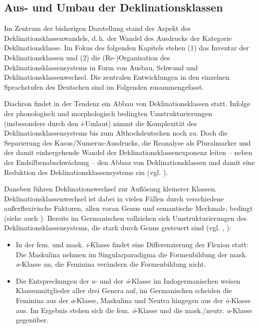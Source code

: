 \subsection{Aus- und Umbau der Deklinationsklassen}
\label{sec:3.1.2}
Im Zentrum der bisherigen Darstellung stand der Aspekt des Deklinationsklassenwandels, d.\,h. der Wandel des Ausdrucks der Kategorie Deklinationsklasse. Im Fokus des folgenden Kapitels stehen (1) das Inventar der Deklinationsklassen und (2) die (Re-)Organisation des Deklinationsklassensystems in Form von Ausbau, Schwund und Deklinationsklassenwechsel. Die zentralen Entwicklungen in den einzelnen Sprachstufen des Deutschen sind im Folgenden zusammengefasst.

Diachron findet in der Tendenz ein Abbau von Deklinationsklassen statt. Infolge der phonologisch und morphologisch bedingten Umstrukturierungen (insbesondere durch den \textit{i}{}-Umlaut) nimmt die Komplexität des Deklinationsklassensystems bis zum Althochdeutschen noch zu. Doch die Separierung des Kasus\slash Numerus-Ausdrucks, die Reanalyse als Pluralmarker und der damit einhergehende Wandel der Deklinationsklassenexponenz leiten -- neben der Endsilbenabschwächung -- den Abbau von Deklinationsklassen und damit eine Reduktion des Deklinationsklassensystems ein (vgl. \citealt[293]{DammelKürschner2018}).

Daneben führen Deklinationswechsel zur Auflösung kleinerer Klassen. Deklinationsklassenwechsel ist dabei in vielen Fällen durch verschiedene außerflexivische Faktoren, allen voran Genus und semantische Merkmale, bedingt (siehe auch ). Bereits im Germanischen vollziehen sich Umstrukturierungen des Deklinationsklassensystems, die stark durch Genus gesteuert sind (vgl. \citealt[74--77]{Kürschner2008a}, \citealt[296--297]{Nübling2008}):

\begin{itemize}
\item In der fem. und mask. \textit{i}-Klasse findet eine Differenzierung der Flexion statt: Die Maskulina nehmen im Singularparadigma die Formenbildung der mask. \textit{a}{}-Klasse an, die Feminina verändern die Formenbildung nicht.
\item Die Entsprechungen der \textit{a}{}- und der \textit{ō}{}-Klasse im Indogermanischen weisen Klassenmitglieder aller drei Genera auf, im Germanischen scheiden die Feminina aus der \textit{a}{}-Klasse, Maskulina und Neutra hingegen aus der \textit{ō}-Klasse aus. Im Ergebnis stehen sich die fem. \textit{ō}-Klasse und die mask./neutr. \textit{a}-Klasse gegenüber.
\end{itemize}

